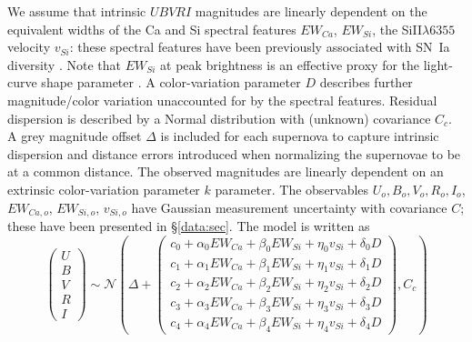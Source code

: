 \documentclass{aastex}   	%
\begin{document}
We assume 
that  intrinsic $UBVRI$ magnitudes are linearly dependent
on the equivalent widths of the Ca and Si spectral features
$EW_{Ca}$, $EW_{Si}$,
the SiII$\lambda6355$ velocity $v_{Si}$:
these spectral features have been previously associated with SN~Ia diversity  
\citep{2006PASP..118..560B, 2009PASP..121..238B, 2009ApJ...699L.139W, 2011ApJ...729...55F,2009A&A...500L..17B}.
Note that $EW_{Si}$ at peak brightness is an effective proxy for the light-curve shape parameter
\citep{2011A&A...529L...4C}. 
A color-variation parameter $D$ describes further magnitude/color variation unaccounted for by the spectral features.
Residual dispersion is described by a Normal distribution with (unknown) covariance $C_c$.  A grey magnitude offset $\Delta$ is included for each supernova
to capture intrinsic dispersion and distance errors introduced when normalizing the supernovae to be at a common distance.
The observed magnitudes are linearly dependent on an
extrinsic color-variation parameter $k$  parameter.  The observables
$U_o, B_o, V_o, R_o, I_o$, $EW_{Ca,o}$, $EW_{Si,o}$, $v_{Si,o}$ have Gaussian measurement uncertainty with covariance $C$; these have
been presented in \S\ref{data:sec}.
The model is written as
\begin{equation}
\begin{pmatrix}
U\\B\\V\\R\\I
\end{pmatrix}
\sim \mathcal{N}
\left(
\Delta +
\begin{pmatrix}
c_0+\alpha_0 EW_{Ca} + \beta_0 EW_{Si} + \eta_0 v_{Si} + \delta_0 D\\
c_1+\alpha_1 EW_{Ca} + \beta_1 EW_{Si} + \eta_1 v_{Si} + \delta_1 D \\
c_2+\alpha_2 EW_{Ca} + \beta_2 EW_{Si} + \eta_2 v_{Si} + \delta_2 D\\
c_3+\alpha_3 EW_{Ca} + \beta_3 EW_{Si} + \eta_3 v_{Si} + \delta_3 D\\
c_4+\alpha_4 EW_{Ca} + \beta_4 EW_{Si}+ \eta_4 v_{Si} + \delta_4 D
\end{pmatrix}
,C_{c}
\right)
\label{ewsiv:eqn}
\end{equation}
\end{document}
